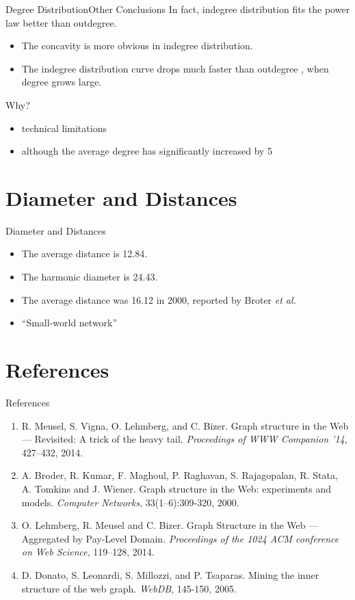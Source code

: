 \documentclass{beamer}
\begin{document}
  \begin{frame}{Degree Distribution}{Other Conclusions}
    In fact, indegree distribution fits the power law better than outdegree. 
    \pause
    \begin{itemize}[<+->]
      \item The concavity is more obvious in indegree distribution.
      \item The indegree distribution curve drops much faster than outdegree , when degree grows large.
    \end{itemize}
    \pause
    Why?
    \pause
    \begin{itemize} [<+->]
      \item technical limitations
      \item although the average degree has significantly increased by 5
    \end{itemize}
  \end{frame}
  
  \section{Diameter and Distances}
  \begin{frame}{Diameter and Distances}
    \begin{itemize}[<+->]
      \item The average distance is 12.84.
      \item The harmonic diameter is 24.43.
      \item The average distance was 16.12 in 2000, reported by Broter \emph{et al.}
      \item ``Small-world network''
    \end{itemize}
  \end{frame}
  
  \section{References}
  \begin{frame}{References}
    \scriptsize
    \begin{enumerate}[\lbrack 1\rbrack]
      \item R. Meusel, S. Vigna, O. Lehmberg, and C. Bizer. Graph structure in the Web --- Revisited: A trick of the heavy tail. \emph{Proceedings of WWW Companion '14}, 427--432, 2014.
      \item A. Broder, R. Kumar, F. Maghoul, P. Raghavan, S. Rajagopalan, R. Stata, A. Tomkins and J. Wiener. Graph structure in the Web: experiments and models. \emph{Computer Networks}, 33(1--6):309-320, 2000.
      \item O. Lehmberg, R. Meusel and C. Bizer. Graph Structure in the Web --- Aggregated by Pay-Level Domain. \emph{Proceedings of the 1024 ACM conference on Web Science}, 119--128, 2014.
      \item D. Donato, S. Leonardi, S. Millozzi, and P. Tsaparas. Mining the inner structure of the web graph. \emph{WebDB}, 145-150, 2005.
    \end{enumerate}
  \end{frame}
\end{document}

